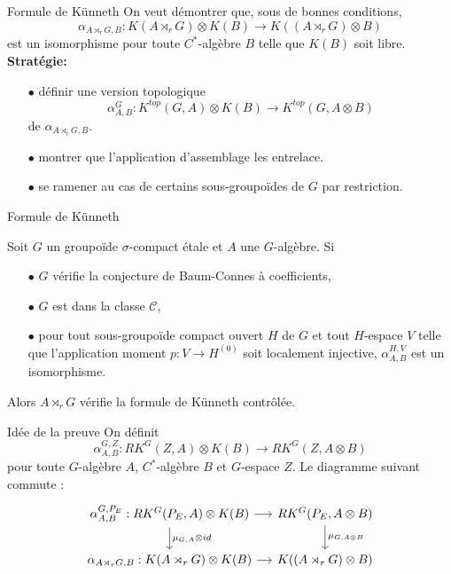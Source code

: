 \begin{frame}{Formule de Künneth}
On veut démontrer que, sous de bonnes conditions,  
\[\alpha_{A\rtimes_r G,B} : K(A\rtimes_r G)\otimes K(B) \rightarrow K((A\rtimes_r G)\otimes B)\]
est un isomorphisme pour toute $C^*$-algèbre $B$ telle que $K(B)$ soit libre.\\
\vspace{0.3 cm}
\textbf{Stratégie:}
\begin{itemize}
\item[$\bullet$] définir une version topologique 
\[\alpha_{A,B}^{G} : K^{top}(G,A)\otimes K(B) \rightarrow K^{top}(G,A\otimes B)\]
de $\alpha_{A\rtimes_r G,B}$.
\item[$\bullet$] montrer que l'application d'assemblage les entrelace.
\item[$\bullet$] se ramener au cas de certains sous-groupoïdes de $G$ par restriction.
\end{itemize}
\end{frame}

\begin{frame}{Formule de Künneth}
\begin{thmfr}
Soit $G$ un groupoïde $\sigma$-compact étale et $A$ une $G$-algèbre. Si 
\begin{itemize}
\item[$\bullet$] $G$ vérifie la conjecture de Baum-Connes à coefficients,
\item[$\bullet$] $G$ est dans la classe $\mathcal C$,
\item[$\bullet$] pour tout sous-groupoïde compact ouvert $H$ de $G$ et tout $H$-espace $V$ telle que l'application moment $p : V\rightarrow H^{(0)}$ soit localement injective, $\alpha_{A,B}^{H,V}$ est un isomorphisme.
\end{itemize} 
Alors $A\rtimes_r G$ vérifie la formule de Künneth contrôlée.
\end{thmfr}
\end{frame}

\begin{frame}{Idée de la preuve}
On définit  
\[\alpha_{A,B}^{G,Z} : RK^G(Z,A)\otimes K(B) \rightarrow RK^G(Z,A\otimes B)\]
pour toute $G$-algèbre $A$, $C^*$-algèbre $B$ et $G$-espace $Z$.
Le diagramme suivant commute :
\[\begin{tikzcd}[ampersand replacement=\&, column sep=small] 
\alpha_{A,B}^{G,P_E}: RK^G(P_E,A)\otimes K(B)\arrow{r}\arrow{d}{\mu_{G,A}\otimes id}    \& RK^G(P_E,A\otimes B)\arrow{d}{\mu_{G,A\otimes B}} \\
\alpha_{A\rtimes_r G,B}: K(A\rtimes_r G) \otimes K(B) \arrow{r} \& K((A\rtimes_r G)\otimes B)
\end{tikzcd}\]
\end{frame}

